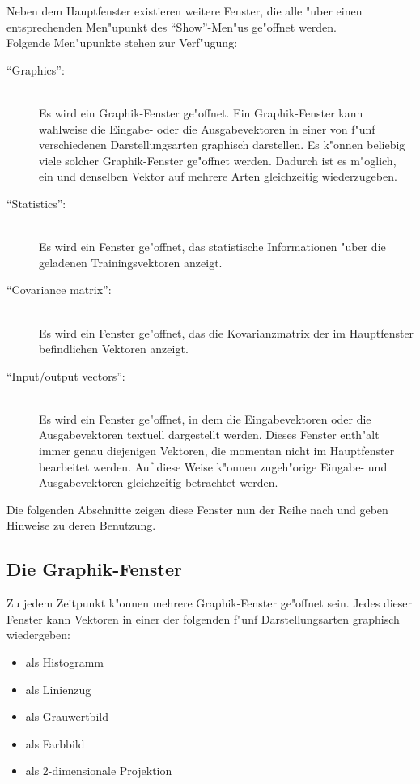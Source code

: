 Neben dem Hauptfenster existieren weitere Fenster, die alle "uber
einen entsprechenden Men"upunkt des "`Show"'-Men"us ge"offnet werden. \\
Folgende Men"upunkte stehen zur Verf"ugung:

\nopagebreak
\begin{description}
\item["`Graphics"':] \mbox{} \\
Es wird ein Graphik-Fenster ge"offnet. 
Ein Graphik-Fenster kann wahlweise die Ein\-ga\-be- oder die Ausgabevektoren
in einer von f"unf verschiedenen Darstellungsarten graphisch darstellen.
Es k"onnen beliebig viele solcher Graphik-Fenster ge"offnet werden.
Dadurch ist es m"oglich, ein und denselben Vektor 
auf mehrere Arten gleichzeitig wiederzugeben.
   
\item["`Statistics"':] \mbox{} \\
Es wird ein Fenster ge"offnet, das statistische Informationen "uber die
geladenen Trai\-nings\-vek\-to\-ren anzeigt.

\item["`Covariance matrix"':] \mbox{} \\
Es wird ein Fenster ge"offnet, 
das die Kovarianzmatrix der im Hauptfenster befindlichen Vektoren
anzeigt.

\item["`Input/output vectors"':] \mbox{} \\
Es wird ein Fenster ge"offnet, in dem die Eingabevektoren oder die
Ausgabevektoren textuell dargestellt werden. 
Dieses Fenster enth"alt immer genau diejenigen Vektoren, die momentan
nicht im Hauptfenster bearbeitet werden.
Auf diese Weise k"onnen zugeh"orige Eingabe- und Ausgabevektoren
gleichzeitig betrachtet werden.
\end{description}

Die folgenden Abschnitte zeigen diese Fenster nun der Reihe nach und
geben Hinweise zu deren Benutzung.
  
\subsection{Die Graphik-Fenster}

Zu jedem Zeitpunkt k"onnen mehrere Graphik-Fenster ge"offnet sein.
Jedes dieser Fenster kann Vektoren in einer der folgenden f"unf
Darstellungsarten graphisch wiedergeben:

\begin{itemize}
\item als Histogramm
\item als Linienzug
\item als Grauwertbild
\item als Farbbild
\item als 2-dimensionale Projektion
\end{itemize} 

